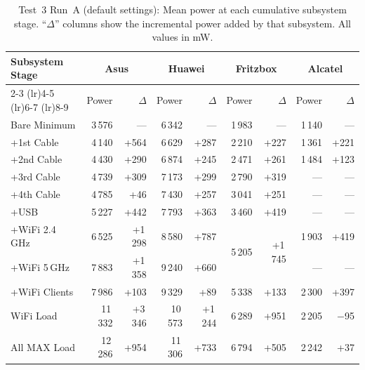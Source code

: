 \begin{table}[H]
    \centering
    \caption{Test~3 Run~A (default settings): Mean power at each cumulative subsystem stage. ``$\Delta$'' columns show the incremental power added by that subsystem. All values in mW.}
    \label{tab:test3_runA}
    \footnotesize\renewcommand{\arraystretch}{0.88}\setlength{\tabcolsep}{3pt}
    \begin{tabular}{l r r r r r r r r}
        \toprule
        \textbf{Subsystem Stage} & \multicolumn{2}{c}{\textbf{Asus}} & \multicolumn{2}{c}{\textbf{Huawei}} & \multicolumn{2}{c}{\textbf{Fritzbox}} & \multicolumn{2}{c}{\textbf{Alcatel}} \\
        \cmidrule(lr){2-3} \cmidrule(lr){4-5} \cmidrule(lr){6-7} \cmidrule(lr){8-9}
        & Power & $\Delta$ & Power & $\Delta$ & Power & $\Delta$ & Power & $\Delta$ \\
        \midrule
        Bare Minimum        & 3\,576 & ---   & 6\,342 & ---   & 1\,983 & ---   & 1\,140 & --- \\
        +1st Cable          & 4\,140 & +564  & 6\,629 & +287  & 2\,210 & +227  & 1\,361 & +221 \\
        +2nd Cable          & 4\,430 & +290  & 6\,874 & +245  & 2\,471 & +261  & 1\,484 & +123 \\
        +3rd Cable          & 4\,739 & +309  & 7\,173 & +299  & 2\,790 & +319  & ---    & --- \\
        +4th Cable          & 4\,785 & +46   & 7\,430 & +257  & 3\,041 & +251  & ---    & --- \\
        +\ac{USB}                & 5\,227 & +442  & 7\,793 & +363  & 3\,460 & +419  & ---    & --- \\
        +WiFi 2.4\,GHz      & 6\,525 & +1\,298 & 8\,580 & +787 & \multirow{2}{*}{5\,205} & \multirow{2}{*}{+1\,745} & 1\,903 & +419 \\
        +WiFi 5\,GHz        & 7\,883 & +1\,358 & 9\,240 & +660 &       &       & ---    & --- \\
        +WiFi Clients       & 7\,986 & +103  & 9\,329 & +89   & 5\,338 & +133  & 2\,300 & +397 \\
        WiFi Load           & 11\,332 & +3\,346 & 10\,573 & +1\,244 & 6\,289 & +951 & 2\,205 & $-$95 \\
        All MAX Load        & 12\,286 & +954 & 11\,306 & +733 & 6\,794 & +505 & 2\,242 & +37 \\
        \bottomrule
    \end{tabular}
\end{table}

